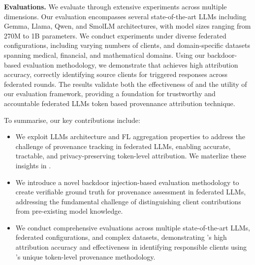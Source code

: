 \textbf{Evaluations.} We evaluate \tool through extensive experiments across multiple dimensions.
Our evaluation encompasses several state-of-the-art LLMs including Gemma, Llama, Qwen, and SmolLM architectures, with model sizes ranging from 270M to 1B parameters. 
We conduct experiments under diverse federated configurations, including varying numbers of clients, and domain-specific datasets spanning medical, financial, and mathematical domains. 
Using our backdoor-based evaluation methodology, we demonstrate that \tool achieves high attribution accuracy, correctly identifying source clients for triggered responses across federated rounds. 
The results validate both the effectiveness of \tool and the utility of our evaluation framework, providing a foundation for trustworthy and accountable federated LLMs token based provennance attribution technique.


To summarise, our key contributions include:
\begin{itemize}
    \item We exploit LLMs architecture and FL aggregation properties to address the challenge of provenance tracking in federated LLMs, enabling accurate, tractable, and privacy-preserving token-level attribution. We materlize these insights in \tool. 
    \item We introduce a novel backdoor injection-based evaluation methodology to create verifiable ground truth for provenance assessment in federated LLMs, addressing the fundamental challenge of distinguishing client contributions from pre-existing model knowledge.
    \item We conduct comprehensive evaluations across multiple state-of-the-art LLMs, federated configurations, and complex datasets, demonstrating \tool's high attribution accuracy and effectiveness in identifying responsible clients using \tool's unique token-level provenance methodology.
\end{itemize}


